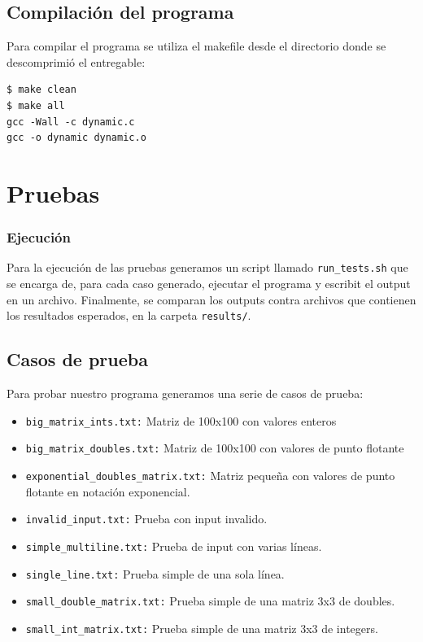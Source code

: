 \documentclass[a4paper,10pt, spanish]{article}
\begin{document}



\lstset{
  language=bash,
  basicstyle=\small\ttfamily
}

\subsection{Compilación del programa}
Para compilar el programa se utiliza el makefile desde el directorio donde se descomprimió el entregable:
\begin{lstlisting}
$ make clean
$ make all
gcc -Wall -c dynamic.c
gcc -o dynamic dynamic.o

\end{lstlisting}

\section{Pruebas}

\subsubsection{Ejecución}

Para la ejecución de las pruebas generamos un script llamado \lstinline{run_tests.sh} que se encarga de, para cada caso generado, ejecutar el programa y escribit el output en un archivo.
Finalmente, se comparan los outputs contra archivos que contienen los resultados esperados, en la carpeta \lstinline{results/}.

\subsection{Casos de prueba}

Para probar nuestro programa generamos una serie de casos de prueba:

\begin{itemize}
  \item \lstinline{big_matrix_ints.txt:} Matriz de 100x100 con valores enteros
	\item \lstinline{big_matrix_doubles.txt:} Matriz de 100x100 con valores de punto flotante
  \item \lstinline{exponential_doubles_matrix.txt:} Matriz pequeña con valores de punto flotante en notación exponencial.
  \item \lstinline{invalid_input.txt:} Prueba con input invalido.
  \item \lstinline{simple_multiline.txt:} Prueba de input con varias líneas.
  \item \lstinline{single_line.txt:} Prueba simple de una sola línea.
  \item \lstinline{small_double_matrix.txt:} Prueba simple de una matriz 3x3 de doubles.
  \item \lstinline{small_int_matrix.txt:} Prueba simple de una matriz 3x3 de integers.
\end{itemize}
\end{document}
